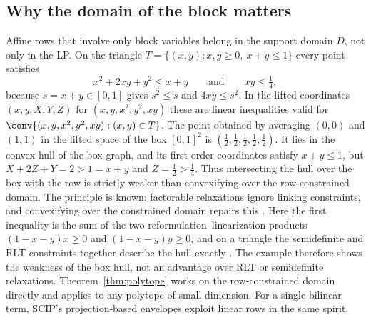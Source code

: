 \subsection{Why the domain of the block matters}\label{sec:domain-matters}

Affine rows that involve only block variables belong in the support
domain $D$, not only in the LP. On the triangle
$T=\{(x,y):x,y\ge0,\ x+y\le1\}$ every point satisfies
\[
x^2+2xy+y^2\le x+y\qquad\text{and}\qquad xy\le\tfrac14,
\]
because $s=x+y\in[0,1]$ gives $s^2\le s$ and $4xy\le s^2$. In the lifted
coordinates $(x,y,X,Y,Z)$ for $(x,y,x^2,y^2,xy)$ these are linear
inequalities valid for $\conv\{(x,y,x^2,y^2,xy):(x,y)\in T\}$. The point
obtained by averaging $(0,0)$ and $(1,1)$ in the lifted space of the box
$[0,1]^2$ is $(\tfrac12,\tfrac12,\tfrac12,\tfrac12,\tfrac12)$. It lies
in the convex hull of the box graph, and its first-order coordinates
satisfy $x+y\le1$, but $X+2Z+Y=2>1=x+y$ and $Z=\tfrac12>\tfrac14$. Thus
intersecting the hull over the box with the row is strictly weaker than
convexifying over the row-constrained domain. The principle is known:
factorable relaxations ignore linking constraints, and convexifying over
the constrained domain repairs this \citep{Rikun1997,ZhuHeTawarmalani2026,WuMutsNowakHendrix2025}.
Here the first inequality is the sum of the two
reformulation--linearization products $(1-x-y)x\ge0$ and $(1-x-y)y\ge0$,
and on a triangle the semidefinite and RLT constraints together describe
the hull exactly \citep{AnstreicherBurer2010}. The example therefore
shows the weakness of the box hull, not an advantage over RLT or
semidefinite relaxations. Theorem~\ref{thm:polytope} works on the
row-constrained domain directly and applies to any polytope of small
dimension. For a single bilinear term, SCIP's projection-based envelopes
\citep{MullerSerranoGleixner2020} exploit linear rows in the same
spirit.


